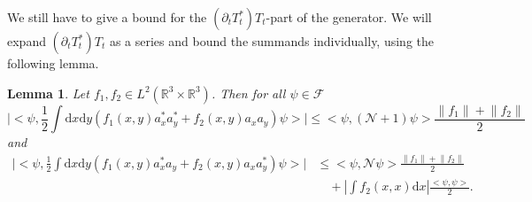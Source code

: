 \documentclass[11pt,a4paper,DIV11]{scrartcl}	%
\newtheorem{lem}[thm]{Lemma}
\newcommand{\fock}{\mathcal{F}}		%
\newcommand{\di}{\textrm{d}}		%
\newcommand{\Ncal}{\mathcal{N}}		%
\newcommand{\scal}[2]{\big<#1,#2\big>} %
\newcommand{\Rbb}{\mathbb{R}}		%
\newcommand{\norm}[1]{\lVert#1\rVert}	%
\begin{document}
We still have to give a bound for the $(\partial_t T^*_t)T_t$-part of the generator. We will expand $(\partial_t T^*_t)T_t$ as a series and bound the summands individually, using the following lemma.
\begin{lem}
\label{lm:Bbound}
Let $f_1, f_2 \in L^2(\Rbb^3\times \Rbb^3)$. Then for all $\psi \in \fock$
 \[
\lvert \scal{\psi}{\frac{1}{2} \int \di x\di y \left( f_1(x,y) a^\ast_x a^\ast_y + f_2(x,y) a_x a_y \right) \psi} \rvert \leq \scal{\psi}{(\Ncal+1)\psi} \frac{\norm{f_1}+\norm{f_2}}{2}
\]
and
\begin{align*}
 \lvert \scal{\psi}{\frac{1}{2} \int \di x\di y \left( f_1(x,y) a^\ast_x
a_y + f_2(x,y) a_x a^\ast_y \right)  \psi} \rvert 
& \leq \scal{\psi}{\Ncal\psi} \frac{\norm{f_1}+\norm{f_2}}{2} \\ & \quad + \left\lvert \int f_2(x,x) \di x \right\rvert \frac{\scal{\psi}{\psi}}{2}.
\end{align*}
\end{lem}
\end{document}
